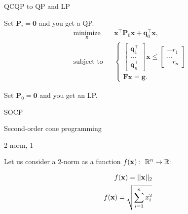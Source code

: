 \documentclass{beamer}
\begin{document}
\begin{frame}{QCQP to QP and LP}
	\begin{flushleft}
		
		Set $\mathbf{P}_i = \mathbf{0}$ and you get a QP.
		\begin{equation}
			\begin{aligned}
				& \underset{\mathbf{x}}{\text{minimize}}
				& & \mathbf{x}^\top \mathbf{P}_0 \mathbf{x} + \mathbf{q}_0^\top\mathbf{x}, \\
				& \text{subject to}
				& & \begin{cases}
					\begin{bmatrix} 
						\mathbf{q}_1^\top \\ ... \\ \mathbf{q}_n^\top
					\end{bmatrix} 
					\mathbf{x} \leq
					\begin{bmatrix} 
						-r_1 \\ ... \\ -r_n
					\end{bmatrix} \\
					\mathbf{F}\mathbf{x} = \mathbf{g}.
				\end{cases}
			\end{aligned}
		\end{equation}
		
		Set $\mathbf{P}_0 = \mathbf{0}$ and you get an LP.
		
	\end{flushleft}
\end{frame}


\begin{frame}{SOCP}
	
	{\huge Second-order cone programming}
	
\end{frame}




\begin{frame}{2-norm, 1}
	\begin{flushleft}
		
		Let us consider a 2-norm as a function $f(\mathbf{x}): \ \mathbb{R}^n \rightarrow \mathbb{R}$:
		
		\begin{align}
			f(\mathbf{x}) = || \mathbf{x} ||_2
			\\
			f(\mathbf{x}) = \sqrt{ \sum_{i=1}^n x_i^2 }
		\end{align}
		
	\end{flushleft}
\end{frame}
\end{document}
